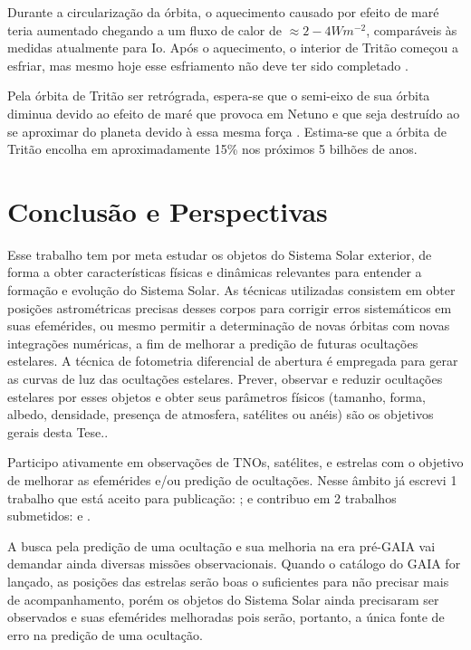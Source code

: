 \documentclass[12pt,a4paper]{monografia}
\begin{document}
Durante a circularização da órbita, o aquecimento causado por efeito de maré teria aumentado chegando a um fluxo de calor de $\approx 2 - 4 W m^{-2}$, comparáveis às medidas atualmente para Io. Após o aquecimento, o interior de Tritão começou a esfriar, mas mesmo hoje esse esfriamento não deve ter sido completado \citep{McKinnon2007}.

Pela órbita de Tritão ser retrógrada, espera-se que o semi-eixo de sua órbita diminua devido ao efeito de maré que provoca em Netuno e que seja destruído ao se aproximar do planeta devido à essa mesma força \citep{McKinnon2007}. Estima-se que a órbita de Tritão encolha em aproximadamente 15\% nos próximos 5 bilhões de anos.


\chapter{Conclusão e Perspectivas}
\label{Cap: perspectivas}

\indent \indent Esse trabalho tem por meta estudar os objetos do Sistema Solar exterior, de forma a obter características físicas e dinâmicas relevantes para entender a formação e evolução do Sistema Solar. As técnicas utilizadas consistem em obter posições astrométricas precisas desses corpos para corrigir erros sistemáticos em suas efemérides, ou mesmo permitir a determinação de novas órbitas com novas integrações numéricas, a fim de melhorar a predição de futuras ocultações estelares. A técnica de fotometria diferencial de abertura é empregada para gerar as curvas de luz das ocultações estelares. Prever, observar e reduzir ocultações estelares por esses objetos e obter seus parâmetros físicos (tamanho, forma, albedo, densidade, presença de atmosfera, satélites ou anéis) são os objetivos gerais desta Tese..

Participo ativamente em observações de TNOs, satélites, e estrelas com o objetivo de melhorar as efemérides e/ou predição de ocultações. Nesse âmbito já escrevi 1 trabalho que está aceito para publicação: \cite{GomesJunior2015-Irregular}; e contribuo em 2 trabalhos submetidos: \cite{Camargo2015} e \cite{Desmars2015}.

A busca pela predição de uma ocultação e sua melhoria na era pré-GAIA vai demandar ainda diversas missões observacionais. Quando o catálogo do GAIA for lançado, as posições das estrelas serão boas o suficientes para não precisar mais de acompanhamento, porém os objetos do Sistema Solar ainda precisaram ser observados e suas efemérides melhoradas pois serão, portanto, a única fonte de erro na predição de uma ocultação.
\end{document}
